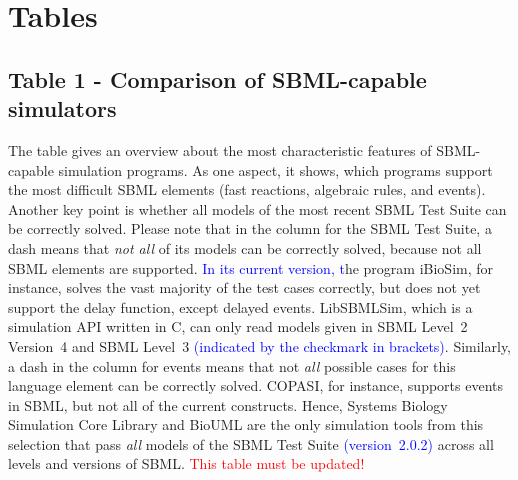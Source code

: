 \documentclass[10pt]{bmc_article}
\newenvironment{bmcformat}{\fussy\setboolean{publ}{true}}{\fussy}
\newcommand{\TODO}[1]{\textcolor{red}{#1}}
\newcommand{\COR}[1]{\textcolor{blue}{#1}}
\begin{document}
\begin{bmcformat}

\section*{Tables}

\subsection*{Table 1 - Comparison of SBML-capable simulators}
The table gives an overview about the most characteristic features of
\acs{SBML}-capable simulation programs. As one aspect, it shows, which programs
support the most difficult \acs{SBML} elements (fast reactions, algebraic rules, and
events). Another key point is whether all models of the most recent SBML Test
Suite \COR{\cite{SBMLtestSuite2013}} can be correctly solved.
Please note that in the column for the SBML Test Suite, a dash means that
\emph{not all} of its models can be correctly solved, because not all \acs{SBML}
elements are supported.
\COR{In its current version, t}he program iBioSim, for instance, solves the vast majority of the test cases
correctly, but does not yet support the delay function, except delayed events.
LibSBMLSim, which is a simulation \acs{API} written in C, can only read models given
in \acs{SBML} Level~2 Version~4 and \acs{SBML} Level~3
\COR{(indicated by the checkmark in brackets)}.
Similarly, a dash in the column for events means that not \emph{all} possible
cases for this language element can be correctly solved.
COPASI, for instance, supports events in \acs{SBML}, but not all of the current 
constructs.
Hence, Systems Biology Simulation Core Library and BioUML are the only
simulation tools from this selection that pass \emph{all} models of the SBML
Test Suite \COR{(version~2.0.2)} across all levels and versions of \acs{SBML}.
\TODO{This table must be updated!}


\end{bmcformat}
\end{document}
